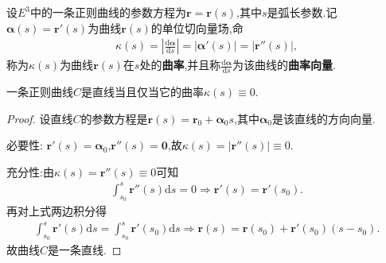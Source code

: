 \documentclass[../../main.tex]{subfiles}%
\begin{document}
\begin{definition}[曲率与曲率向量]
设$E^3$中的一条正则曲线的参数方程为$\bm{r}=\bm{r}(s)$,其中$s$是弧长参数.记$\bm{\alpha}(s)=\bm{r}'(s)$为曲线$\bm{r}(s)$的单位切向量场,命
\begin{align*}
\kappa \left( s \right) =\left| \frac{\mathrm{d}\boldsymbol{\alpha }}{\mathrm{d}s} \right|=|\bm{\alpha}'(s)|=\left| \boldsymbol{r}'' \left( s \right) \right|,
\end{align*}
称为$\kappa \left( s \right)$为曲线$\bm{r}(s)$在$s$处的\textbf{曲率},并且称$\frac{\mathrm{d}\bm{\alpha}}{\mathrm{d}s}$为该曲线的\textbf{曲率向量}.
\end{definition}

\begin{theorem}\label{theorem:正则曲线是直线等价于曲率为0}
一条正则曲线$C$是直线当且仅当它的曲率$\kappa(s)\equiv 0$.
\end{theorem}
\begin{proof}
设直线$C$的参数方程是$\bm{r}(s)=\bm{r}_0+\bm{\alpha}_0 s$,其中$\bm{\alpha}_0$是该直线的方向向量.

{\heiti 必要性:}
$\bm{r}'(s)=\bm{\alpha}_0$,$\bm{r}''(s)=\bm{0}$,故$\kappa(s)=|\bm{r}''(s)|\equiv 0$.

{\heiti 充分性:}由$\kappa(s)=\bm{r}''(s)\equiv 0$可知
\begin{align*}
\int_{s_0}^s \bm{r}''(s)\mathrm{d}s=0\Longrightarrow \bm{r}'(s)=\bm{r}'(s_0).
\end{align*}
再对上式两边积分得
\begin{align*}
\int_{s_0}^s \bm{r}'(s)\mathrm{d}s=\int_{s_0}^s \bm{r}'(s_0)\mathrm{d}s\Longrightarrow \bm{r}(s)=\bm{r}(s_0)+\bm{r}'(s_0)(s-s_0).
\end{align*}
故曲线$C$是一条直线.
\end{proof}
\end{document}

